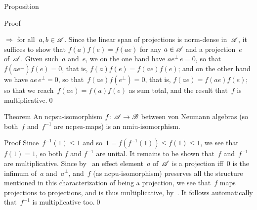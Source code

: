 \documentclass[a]{subfiles}
\begin{document}
\begin{parsec}
\begin{point}[gardner]{Proposition}
\begin{point}{Proof}
\begin{point}{$\Longrightarrow$}
for all~$a,b\in \mathscr{A}$.
Since the linear span of projections is norm-dense in~$\mathscr{A}$,
it suffices to show that $f(a)f(e)=f(ae)$
for any $a\in\mathscr{A}$ and a projection~$e$ of~$\mathscr{A}$.
Given such~$a$ and~$e$,
we on the one hand have $ae^\perp\, e=0$,
so that~$f(ae^\perp)f(e)=0$,
that is, $f(a)f(e)=f(ae)f(e)$;
and on the other hand
we have $ae\,e^\perp=0$,
so that~$f(ae)f(e^\perp)=0$,
that is, $f(ae)=f(ae)f(e)$;
so that we reach~$f(ae)=f(a)f(e)$ as sum total,
and the result that~$f$ is multiplicative.\qed
\end{point}
\end{point}
\end{point}
\begin{point}[iso]{Theorem}%
An ncpsu-isomorphism $f\colon \mathscr{A}\to\mathscr{B}$
between von Neumann algebras 
(so both~$f$ and~$f^{-1}$ are ncpsu-maps)
is an nmiu-isomorphism.
\begin{point}{Proof}%
Since~$f^{-1}(1)\leq 1$
and so~$1=f(f^{-1}(1))\leq f(1)\leq 1$,
we see that~$f(1)=1$, so both $f$ and $f^{-1}$ are unital.
It remains to be shown that~$f$ and~$f^{-1}$ are multiplicative.
Since by~ an effect element~$a$ of~$\mathscr{A}$
is a projection iff~$0$ is the infimum of~$a$ and~$a^\perp$,
and~$f$ (as ncpu-isomorphism) preserves all the structure 
mentioned in this characterization of being a projection,
we see that~$f$ maps projections to projections,
and is thus multiplicative, by~.
It follows automatically that~$f^{-1}$ is multiplicative too.\qed
\end{point}
\end{point}
\end{parsec}
\end{document}
